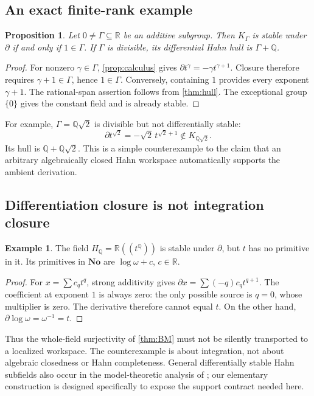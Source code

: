 \documentclass[11pt,a4paper]{article}
\newtheorem{proposition}[theorem]{Proposition}
\theoremstyle{definition}
\newtheorem{example}[theorem]{Example}
\newcommand{\No}{\mathbf{No}}
\newcommand{\R}{\mathbb R}
\newcommand{\Q}{\mathbb Q}
\newcommand{\D}{\partial}
\numberwithin{equation}{section}
\begin{document}
\subsection{An exact finite-rank example}
\begin{proposition}\label{prop:realgroup}
Let $0\ne\Gamma\subseteq\R$ be an additive subgroup. Then $K_\Gamma$ is
stable under $\D$ if and only if $1\in\Gamma$. If $\Gamma$ is divisible,
its differential Hahn hull is $\Gamma+\Q$.
\end{proposition}
\begin{proof}
For nonzero $\gamma\in\Gamma$, \cref{prop:calculus} gives
$\D t^\gamma=-\gamma t^{\gamma+1}$. Closure therefore requires
$\gamma+1\in\Gamma$, hence $1\in\Gamma$. Conversely, containing $1$
provides every exponent $\gamma+1$. The rational-span assertion follows
from \cref{thm:hull}. The exceptional group $\{0\}$ gives the constant
field and is already stable.
\end{proof}
For example, $\Gamma=\Q\sqrt2$ is divisible but not differentially stable:
\[
 \D t^{\sqrt2}=-\sqrt2\,t^{\sqrt2+1}\notin K_{\Q\sqrt2}.
\]
Its hull is $\Q+\Q\sqrt2$. This is a simple counterexample to the claim
that an arbitrary algebraically closed Hahn workspace automatically
supports the ambient derivation.

\subsection{Differentiation closure is not integration closure}
\begin{example}\label{ex:logintegral}
The field $H_\Q=\R((t^\Q))$ is stable under $\D$, but $t$ has no primitive
in it. Its primitives in $\No$ are $\log\omega+c$, $c\in\R$.
\end{example}
\begin{proof}
For $x=\sum c_qt^q$, strong additivity gives
$\D x=\sum(-q)c_qt^{q+1}$. The coefficient at exponent $1$ is always zero:
the only possible source is $q=0$, whose multiplier is zero. The derivative
therefore cannot equal $t$. On the other hand,
$\D\log\omega=\omega^{-1}=t$.
\end{proof}
Thus the whole-field surjectivity of \cref{thm:BM} must not be silently
transported to a localized workspace. The counterexample is about
integration, not about algebraic closedness or Hahn completeness. General
differentially stable Hahn subfields also occur in the model-theoretic
analysis of \cite{ADH}; our elementary construction is designed specifically
to expose the support contract needed here.
\end{document}

